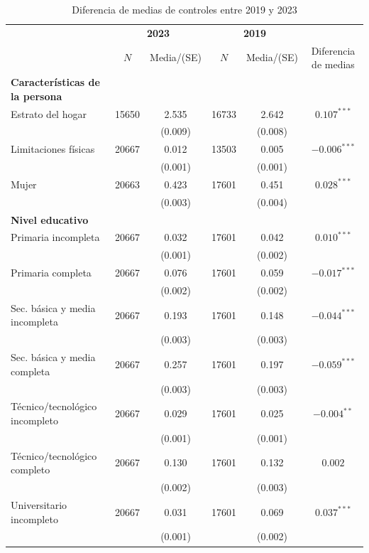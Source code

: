 \documentclass{article}
\begin{document}
\begin{table}[H]
  \centering
  \caption{Diferencia de medias de controles entre 2019 y 2023}
  \label{tab:balance_2019_2023}
  \begin{tabular}{l c c c c c}
    \toprule
    & \multicolumn{2}{c}{\textbf{2023}} & \multicolumn{2}{c}{\textbf{2019}} & \\
    \cmidrule(lr){2-3} \cmidrule(lr){4-5}
    & $N$ & Media/(SE) & $N$ & Media/(SE) & Diferencia de medias \\
    \midrule
    \textbf{Características de la persona} & & & & & \\
    Estrato del hogar & 15650 & 2.535 & 16733 & 2.642 & $0.107^{***}$ \\
     & & (0.009) & & (0.008) & \\
    Limitaciones físicas & 20667 & 0.012 & 13503 & 0.005 & $-0.006^{***}$ \\
     & & (0.001) & & (0.001) & \\
    Mujer & 20663 & 0.423 & 17601 & 0.451 & $0.028^{***}$ \\
     & & (0.003) & & (0.004) & \\
    \midrule
    \textbf{Nivel educativo} & & & & & \\
    Primaria incompleta & 20667 & 0.032 & 17601 & 0.042 & $0.010^{***}$ \\
     & & (0.001) & & (0.002) & \\
    Primaria completa & 20667 & 0.076 & 17601 & 0.059 & $-0.017^{***}$ \\
     & & (0.002) & & (0.002) & \\
    Sec. básica y media incompleta & 20667 & 0.193 & 17601 & 0.148 & $-0.044^{***}$ \\
     & & (0.003) & & (0.003) & \\
    Sec. básica y media completa & 20667 & 0.257 & 17601 & 0.197 & $-0.059^{***}$ \\
     & & (0.003) & & (0.003) & \\
    Técnico/tecnológico incompleto & 20667 & 0.029 & 17601 & 0.025 & $-0.004^{**}$ \\
     & & (0.001) & & (0.001) & \\
    Técnico/tecnológico completo & 20667 & 0.130 & 17601 & 0.132 & $0.002$ \\
     & & (0.002) & & (0.003) & \\
    Universitario incompleto & 20667 & 0.031 & 17601 & 0.069 & $0.037^{***}$ \\
     & & (0.001) & & (0.002) & \\

\end{tabular}
\end{table}
\end{document}
